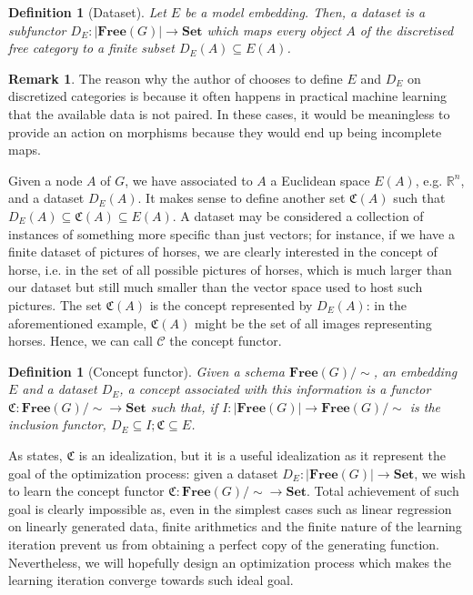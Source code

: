 \documentclass[11pt,a4paper,openright,twoside]{report}
\theoremstyle{plain}
\newtheorem{definition}[proposition]{Definition}
\theoremstyle{definition}
\newtheorem{remark}[proposition]{Remark}
\begin{document}
\begin{definition}[Dataset]
  Let $E$ be a model embedding. Then, a dataset is a subfunctor $D_E: |\mathbf{Free}(G)| \to \mathbf{Set}$ which maps every object $A$ of the discretised free category to a finite subset $D_E(A) \subseteq E(A)$.
\end{definition}

\begin{remark}
  The reason why the author of \cite{gavranovic2019compositional} chooses to define $E$ and $D_E$ on discretized categories is because it often happens in practical machine learning that the available data is not paired. In these cases, it would be meaningless to provide an action on morphisms because they would end up being incomplete maps.
\end{remark}

Given a node $A$ of $G$, we have associated to $A$ a Euclidean space $E(A)$, e.g. $\mathbb{R}^n$, and a dataset $D_E(A)$. It makes sense to define another set $\mathfrak{C}(A)$ such that $D_E(A) \subseteq \mathfrak{C}(A) \subseteq E(A)$. A dataset may be considered a collection of instances of something more specific than just vectors; for instance, if we have a finite dataset of pictures of horses, we are clearly interested in the concept of horse, i.e. in the set of all possible pictures of horses, which is much larger than our dataset but still much smaller than the vector space used to host such pictures. The set $\mathfrak{C}(A)$ is the concept represented by $D_E(A)$: in the aforementioned example, $\mathfrak{C}(A)$ might be the set of all images representing horses. Hence, we can call $\mathcal{C}$ the concept functor. 

\begin{definition}[Concept functor]
  Given a schema $\mathbf{Free}(G)/{\sim}$, an embedding $E$ and a dataset $D_E$, a concept associated with this information is a functor $\mathfrak{C}: \mathbf{Free}(G)/{\sim} \to \mathbf{Set}$ such that, if $I: |\mathbf{Free}(G)| \to \mathbf{Free}(G)/{\sim}$ is the inclusion functor, $D_E \subseteq I;\mathfrak{C} \subseteq E$.
\end{definition}

As \cite{gavranovic2019compositional} states, $\mathfrak{C}$ is an idealization, but it is a useful idealization as it represent the goal of the optimization process: given a dataset $D_E: |\mathbf{Free}(G)| \to \mathbf{Set}$, we wish to learn the concept functor $\mathfrak{C}: \mathbf{Free}(G)/{\sim} \to \mathbf{Set}$. Total achievement of such goal is clearly impossible as, even in the simplest cases such as linear regression on linearly generated data, finite arithmetics and the finite nature of the learning iteration prevent us from obtaining a perfect copy of the generating function.
Nevertheless, we will hopefully design an optimization process which makes the learning iteration converge towards such ideal goal.
\end{document}
